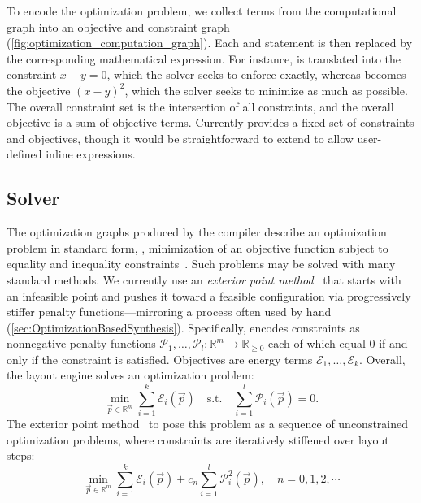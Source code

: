  
 To encode the optimization problem, we collect terms from the computational graph into an objective and constraint graph (\cref{fig:optimization_computation_graph}). Each  and  statement is then replaced by the corresponding mathematical expression.  For instance,  is translated into the constraint \(x-y=0\), which the solver seeks to enforce exactly, whereas  becomes the objective \((x-y)^2\), which the solver seeks to minimize as much as possible.  The overall constraint set is the intersection of all constraints, and the overall objective is a sum of objective terms. Currently \Penrose{} provides a fixed set of constraints and objectives, though it would be straightforward to extend \Style{} to allow user-defined inline expressions.


\subsection{Solver}
\label{sec:Solver}

The optimization graphs produced by the compiler describe an optimization problem in standard form, \ie, minimization of an objective function subject to equality and inequality constraints~\cite[Section 4.1]{convexOptimization}.  Such problems may be solved with many standard methods. We currently use an \emph{exterior point method}~\cite{hiroshi_primal-dual_2010} that starts with an infeasible point and pushes it toward a feasible configuration via progressively stiffer penalty functions---mirroring a process often used by hand (\cref{sec:OptimizationBasedSynthesis}). Specifically, \Penrose encodes constraints as nonnegative penalty functions \(\mathcal{P}_1, \ldots, \mathcal{P}_l: \mathbb{R}^m \to \mathbb{R}_{\geq 0}\) each of which equal $0$ if and only if the constraint is satisfied. Objectives are energy terms  \(\mathcal{E}_1, \ldots, \mathcal{E}_k\). Overall, the \Penrose layout engine solves an optimization problem:%
\begin{equation}
   \label{eq:MainProblem}
       \min_{\vec p \in \mathbb{R}^m} \sum_{i=1}^k \mathcal{E}_i(\vec p)  \quad  \text{s.t.} \quad \sum_{i=1}^l \mathcal{P}_i(\vec p) = 0.
\end{equation}%
The exterior point method~\citep{hiroshi_primal-dual_2010} to pose this problem as a sequence of unconstrained optimization problems, where constraints are iteratively stiffened over layout steps: 
\begin{equation}
   \label{eq:ExteriorPointProblem}
   \min_{\vec p \in \mathbb{R}^m} \sum_{i=1}^k \mathcal{E}_i(\vec p) + c_n\sum_{i=1}^l \mathcal{P}_i^2(\vec p), \quad n = 0, 1, 2, \cdots
\end{equation}%

